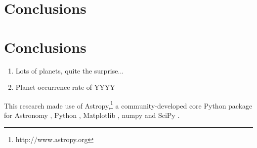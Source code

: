 \documentclass[onecolumn]{aa} %
\begin{document}
\section{Conclusions}\label{sec:conc}
\lipsum[2-8]



\section{Conclusions}\label{sec:conclusion}

   \begin{enumerate}
      \item Lots of planets, quite the surprise...
      \item Planet occurrence rate of YYYY
   \end{enumerate}

\begin{acknowledgements}
This research made use of Astropy,\footnote{http://www.astropy.org} a community-developed core Python package for Astronomy \citep{astropy:2013, astropy:2018}, Python \citep{vanRossum95,Oliphant07}, Matplotlib \citep{Hunter07}, numpy \citep{Oliphant06,vanderWalt11} and SciPy \citep{Virtanen20}.
\end{acknowledgements}





\end{document}
